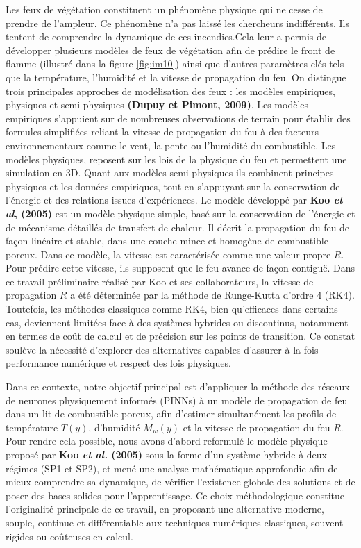 \documentclass[12pt, oneside]{report} %
\theoremstyle{definition}
\theoremstyle{remark}
\begin{document}
Les feux de végétation constituent un phénomène physique qui ne cesse de prendre de l'ampleur. Ce phénomène n'a pas laissé les chercheurs indifférents. Ils tentent de comprendre la dynamique de ces incendies.Cela leur a permis de développer plusieurs modèles de feux de végétation afin de prédire le front de flamme (illustré dans la figure \eqref{fig:im10}) ainsi que d'autres paramètres clés tels que la température, l'humidité et la vitesse de propagation du feu. On distingue trois principales approches de modélisation des feux : les modèles empiriques, physiques et semi-physiques \textbf{(Dupuy et Pimont, 2009)}. Les modèles empiriques s'appuient sur de nombreuses observations de terrain pour établir des formules simplifiées reliant la vitesse de propagation du feu à des facteurs environnementaux comme le vent, la pente ou l'humidité du combustible.
	Les modèles physiques, reposent sur les lois de la physique du feu et permettent une simulation en 3D. 
Quant aux modèles semi-physiques ils combinent principes physiques et les données empiriques, tout en s'appuyant sur la conservation de l'énergie et des relations issues d'expériences. Le modèle développé par \textbf{Koo \textit{et al}, (2005)} est un modèle physique simple, basé sur la conservation de l'énergie et de mécanisme détaillés de transfert de chaleur. Il décrit la propagation du feu de façon linéaire et stable, dans une couche mince et homogène de combustible poreux. Dans ce modèle, la vitesse est caractérisée comme une valeur propre $R$. Pour prédire cette vitesse, ils supposent que le feu avance de façon contiguë.
Dans ce travail préliminaire réalisé par Koo et ses collaborateurs, la vitesse de propagation $R$ a été déterminée par la méthode de Runge-Kutta d'ordre 4 (RK4). \clearpage	
Toutefois, les méthodes classiques comme RK4, bien qu’efficaces dans certains cas, deviennent limitées face à des systèmes hybrides ou discontinus, notamment en termes de coût de calcul et de précision sur les points de transition. Ce constat soulève la nécessité d’explorer des alternatives capables d’assurer à la fois performance numérique et respect des lois physiques.

Dans ce contexte, notre objectif principal est d’appliquer la méthode des réseaux de neurones physiquement informés (PINNs) à un modèle de propagation de feu dans un lit de combustible poreux, afin d’estimer simultanément les profils de température $T(y)$, d’humidité $M_w(y)$ et la vitesse de propagation du feu $R$.
Pour rendre cela possible, nous avons d’abord reformulé le modèle physique proposé par \textbf{Koo \textit{et al.} (2005)} sous la forme d’un système hybride à deux régimes (SP1 et SP2), et mené une analyse mathématique approfondie afin de mieux comprendre sa dynamique, de vérifier l’existence globale des solutions et de poser des bases solides pour l’apprentissage.
Ce choix méthodologique constitue l’originalité principale de ce travail, en proposant une alternative moderne, souple, continue et différentiable aux techniques numériques classiques, souvent rigides ou coûteuses en calcul.
\end{document}
